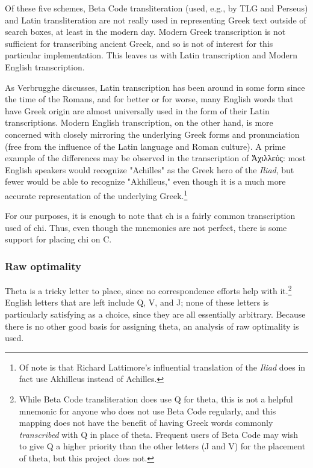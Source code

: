 \documentclass[11pt]{article}
\begin{document}
Of these five schemes, Beta Code transliteration (used, e.g., by TLG and Perseus) and Latin transliteration are not really used in representing Greek text outside of search boxes, at least in the modern day. Modern Greek transcription is not sufficient for transcribing ancient Greek, and so is not of interest for this particular implementation. This leaves us with Latin transcription and Modern English transcription.

As Verbrugghe discusses, Latin transcription has been around in some form since the time of the Romans, and for better or for worse, many English words that have Greek origin are almost universally used in the form of their Latin transcriptions. Modern English transcription, on the other hand, is more concerned with closely mirroring the underlying Greek forms and pronunciation (free from the influence of the Latin language and Roman culture). A prime example of the differences may be observed in the transcription of Ἀχιλλεύς: most English speakers would recognize "Achilles" as the Greek hero of the \emph{Iliad}, but fewer would be able to recognize "Akhilleus," even though it is a much more accurate representation of the underlying Greek.\footnote{Of note is that Richard Lattimore's influential translation of the \emph{Iliad} does in fact use Akhilleus instead of Achilles.}

For our purposes, it is enough to note that ch is a fairly common transcription used of chi. Thus, even though the mnemonics are not perfect, there is some support for placing chi on C.

\subsubsection{Raw optimality}
\label{sec:org34dabb5}

Theta is a tricky letter to place, since no correspondence efforts help with it.\footnote{While Beta Code transliteration does use Q for theta, this is not a helpful mnemonic for anyone who does not use Beta Code regularly, and this mapping does not have the benefit of having Greek words commonly \emph{transcribed} with Q in place of theta. Frequent users of Beta Code may wish to give Q a higher priority than the other letters (J and V) for the placement of theta, but this project does not.} English letters that are left include Q, V, and J; none of these letters is particularly satisfying as a choice, since they are all essentially arbitrary. Because there is no other good basis for assigning theta, an analysis of raw optimality is used.
\end{document}
